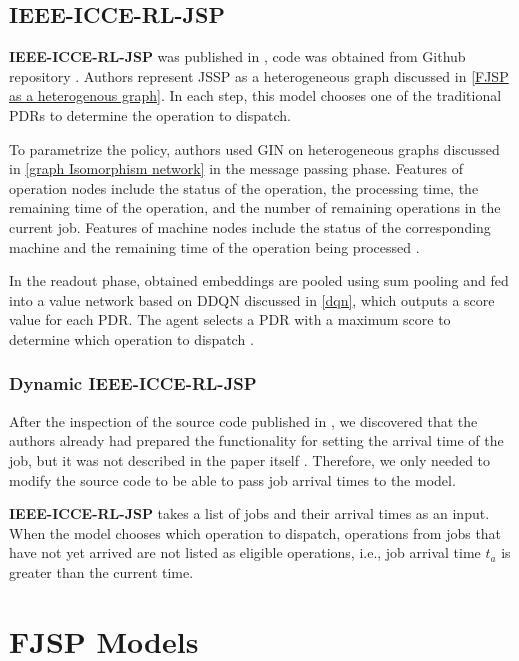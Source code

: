 \subsection{IEEE-ICCE-RL-JSP}

\textbf{IEEE-ICCE-RL-JSP} was published in \cite{10226873}, code was obtained from Github repository \cite{github_ieee_icce_rl_jsp}. Authors represent JSSP as a heterogeneous graph discussed in \ref{FJSP as a heterogenous graph}. In each step, this model chooses one of the traditional PDRs to determine the operation to dispatch.
\par
To parametrize the policy, authors used GIN on heterogeneous graphs discussed in \ref{graph Isomorphism network} in the message passing phase. Features of operation nodes include the status of the operation, the processing time, the remaining time of the operation, and the number of remaining operations in the current job. Features of machine nodes include the status of the corresponding machine and the remaining time of the operation being processed \cite{10226873}.
\par
In the readout phase, obtained embeddings are pooled using sum pooling and fed into a value network based on DDQN discussed in \ref{dqn}, which outputs a score value for each PDR. The agent selects a PDR with a maximum score to determine which operation to dispatch \cite{10226873}.

\subsubsection{Dynamic IEEE-ICCE-RL-JSP}

After the inspection of the source code \cite{github_ieee_icce_rl_jsp} published in \cite{10226873}, we discovered that the authors already had prepared the functionality for setting the arrival time of the job, but it was not described in the paper itself \cite{10226873}. Therefore, we only needed to modify the source code to be able to pass job arrival times to the model. 
\par
\textbf{IEEE-ICCE-RL-JSP} takes a list of jobs and their arrival times as an input. When the model chooses which operation to dispatch, operations from jobs that have not yet arrived are not listed as eligible operations, i.e., job arrival time $t_a$ is greater than the current time.

\section{FJSP Models}

